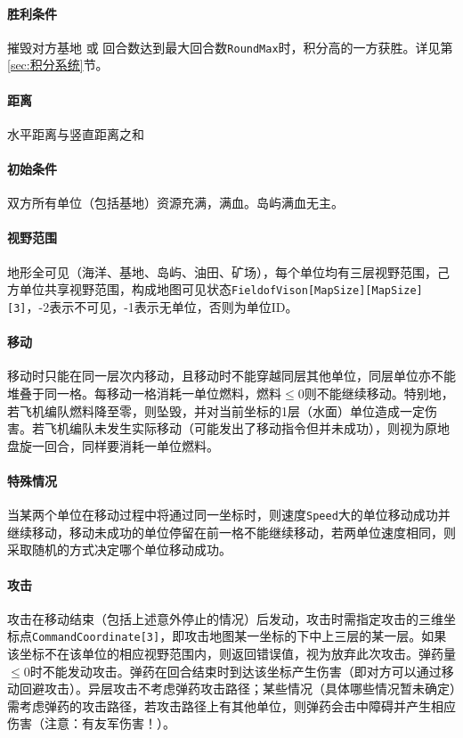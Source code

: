 \documentclass[11pt,a4paper]{article}
\begin{document}
      \paragraph{胜利条件}
        摧毁对方基地 或 回合数达到最大回合数\texttt{RoundMax}时，积分高的一方获胜。详见第\ref{sec:积分系统}节。

      \paragraph{距离}
        水平距离与竖直距离之和

      \paragraph{初始条件}
        双方所有单位（包括基地）资源充满，满血。岛屿满血无主。

      \paragraph{视野范围}
        地形全可见（海洋、基地、岛屿、油田、矿场），每个单位均有三层视野范围，己方单位共享视野范围，构成地图可见状态\texttt{FieldofVison[MapSize][MapSize][3]}，-2表示不可见，-1表示无单位，否则为单位ID。

      \paragraph{移动}
        移动时只能在同一层次内移动，且移动时不能穿越同层其他单位，同层单位亦不能堆叠于同一格。每移动一格消耗一单位燃料，燃料$\leq 0$则不能继续移动。特别地，若飞机编队燃料降至零，则坠毁，并对当前坐标的1层（水面）单位造成一定伤害。若飞机编队未发生实际移动（可能发出了移动指令但并未成功），则视为原地盘旋一回合，同样要消耗一单位燃料。

      \paragraph{特殊情况}
        当某两个单位在移动过程中将通过同一坐标时，则速度\texttt{Speed}大的单位移动成功并继续移动，移动未成功的单位停留在前一格不能继续移动，若两单位速度相同，则采取随机的方式决定哪个单位移动成功。

      \paragraph{攻击}
        攻击在移动结束（包括上述意外停止的情况）后发动，攻击时需指定攻击的三维坐标点\texttt{CommandCoordinate[3]}，即攻击地图某一坐标的下中上三层的某一层。如果该坐标不在该单位的相应视野范围内，则返回错误值，视为放弃此次攻击。弹药量$\leq 0$时不能发动攻击。弹药在回合结束时到达该坐标产生伤害（即对方可以通过移动回避攻击）。异层攻击不考虑弹药攻击路径；某些情况（具体哪些情况暂未确定）需考虑弹药的攻击路径，若攻击路径上有其他单位，则弹药会击中障碍并产生相应伤害（注意：有友军伤害！）。
\end{document}
